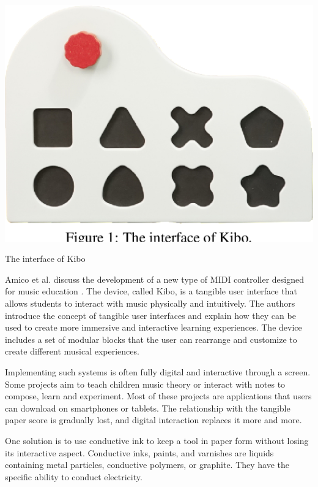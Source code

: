 \begin{marginfigure}
   \centering
   \includegraphics{images/IS_kibo.png}
   \caption{The interface of Kibo}
   \label{fig:amico2020kibo}
\end{marginfigure}

Amico et al. discuss the development of a new type of MIDI controller designed for music education \cite{amico2020kibo}. The device, called Kibo, is a tangible user interface that allows students to interact with music physically and intuitively.
The authors introduce the concept of tangible user interfaces and explain how they can be used to create more immersive and interactive learning experiences.
The device includes a set of modular blocks that the user can rearrange and customize to create different musical experiences.

Implementing such systems is often fully digital and interactive through a screen. Some projects aim to teach children music theory or interact with notes to compose, learn and experiment. Most of these projects are applications that users can download on smartphones or tablets. The relationship with the tangible paper score is gradually lost, and digital interaction replaces it more and more.

One solution is to use conductive ink to keep a tool in paper form without losing its interactive aspect. Conductive inks, paints, and varnishes are liquids containing metal particles, conductive polymers, or graphite. They have the specific ability to conduct electricity.


